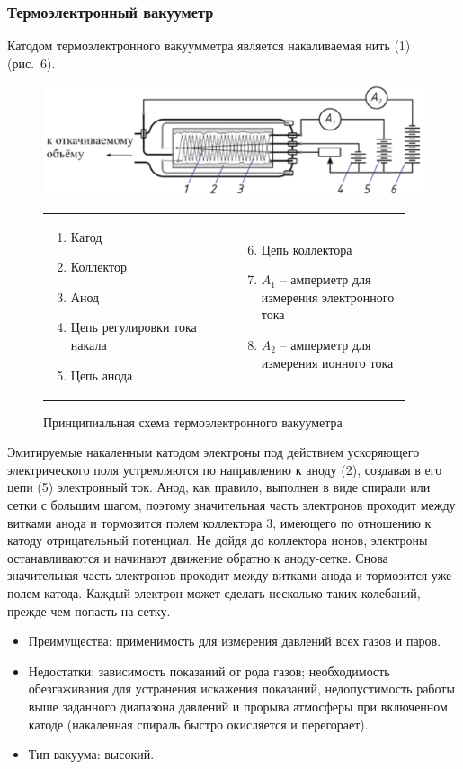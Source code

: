 \documentclass[a4paper,12pt]{article}
\theoremstyle{plain} %
\theoremstyle{definition} %
\theoremstyle{remark} %
\begin{document}
\subsubsection{Термоэлектронный вакууметр}
Катодом термоэлектронного вакуумметра является накаливаемая нить (1) (\mbox{рис. 6}). 
\begin{figure}[H]
	\begin{center}
		\includegraphics[width=\linewidth]{6}
		\begin{tabular}{p{0.5\linewidth} p{0.45\linewidth}}
			\begin{enumerate}
				\item Катод
				\item Коллектор
				\item Анод
				\item Цепь регулировки тока накала
				\item Цепь анода
			\end{enumerate}  &
			\begin{enumerate}
				\setcounter{enumi}{5}
				\item Цепь коллектора
				\item $A_1$ -- амперметр для измерения электронного тока
				\item $A_2$ -- амперметр для измерения ионного тока
			\end{enumerate} 
		\end{tabular}
		\caption {Принципиальная схема термоэлектронного вакууметра}
	\end{center}
\end{figure}

Эмитируемые накаленным катодом электроны под действием ускоряющего электрического поля устремляются по направлению к аноду (2), создавая в его цепи (5) электронный ток. Анод, как правило, выполнен в виде спирали или сетки с большим шагом, поэтому значительная часть электронов проходит между витками анода и тормозится полем коллектора 3, имеющего по отношению к катоду отрицательный потенциал. Не дойдя до коллектора ионов, электроны останавливаются и начинают движение обратно к аноду-сетке. Снова значительная часть электронов проходит между витками анода и тормозится уже полем катода. Каждый электрон может сделать несколько таких колебаний, прежде чем попасть на сетку.
\begin{itemize}
	\item Преимущества: применимость для измерения давлений всех газов и паров.
	\item Недостатки: зависимость показаний от рода газов; необходимость обезгаживания для устранения искажения показаний, недопустимость работы выше заданного диапазона давлений и прорыва атмосферы при включенном катоде (накаленная спираль быстро окисляется и перегорает).
	\item Тип вакуума: высокий.
\end{itemize}
\end{document}

